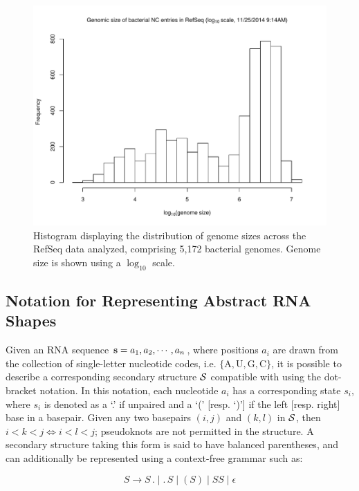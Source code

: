 \begin{figure}[!ht]
  \centering
    \includegraphics[width=.75\textwidth]{Figures/Ribofinder/refseq_genome_sizes.pdf}
  \caption{Histogram displaying the distribution of genome sizes across the RefSeq data analyzed, comprising 5,172 bacterial genomes. Genome size is shown using a $\log_{10}$ scale.}
  \label{fig:genome_sizes}
\end{figure}

\subsection{Notation for Representing Abstract RNA Shapes} \label{sub:shapes}

Given an RNA sequence ${\bf s} = a_1, a_2, \cdots, a_n$, where positions $a_i$ are drawn from the collection of single-letter nucleotide codes, i.e. $\{\text{A},\text{U},\text{G},\text{C}\}$, it is possible to describe a corresponding secondary structure ${\mathcal S}$ compatible with \seq using the dot-bracket notation. In this notation, each nucleotide $a_i$ has a corresponding state $s_i$, where $s_i$ is denoted as a `.' if unpaired and a `(' [resp. `)'] if the left [resp. right] base in a basepair. Given any two basepairs $(i,j)$ and $(k,l)$ in ${\mathcal S}$, then $i < k < j \iff i < l < j$; pseudoknots are not permitted in the structure. A secondary structure taking this form is said to have balanced parentheses, and can additionally be represented using a context-free grammar such as:

\begin{equation} \label{eq:str_cfg}
S \rightarrow S\,.\;|\;.\,S\;|\;(S)\;|\;SS\;|\;\epsilon
\end{equation}

